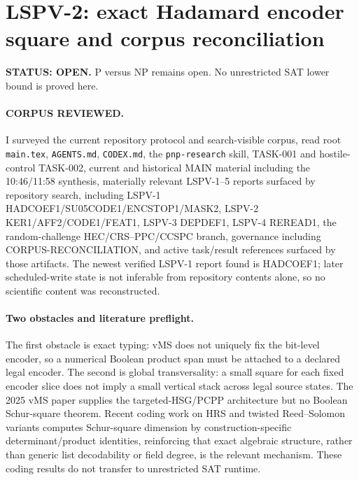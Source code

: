 \documentclass[11pt]{article}
\begin{document}
\section*{LSPV-2: exact Hadamard encoder square and corpus reconciliation}
\textbf{STATUS: OPEN.} P versus NP remains open. No unrestricted SAT lower bound is proved here.

\paragraph{CORPUS REVIEWED.}
I surveyed the current repository protocol and search-visible corpus, read root \texttt{main.tex}, \texttt{AGENTS.md}, \texttt{CODEX.md}, the \texttt{pnp-research} skill, TASK-001 and hostile-control TASK-002, current and historical MAIN material including the 10:46/11:58 synthesis, materially relevant LSPV-1--5 reports surfaced by repository search, including LSPV-1 HADCOEF1/SU05CODE1/ENCSTOP1/MASK2, LSPV-2 KER1/AFF2/CODE1/FEAT1, LSPV-3 DEPDEF1, LSPV-4 REREAD1, the random-challenge HEC/CRS--PPC/CCSPC branch, governance including CORPUS-RECONCILIATION, and active task/result references surfaced by those artifacts. The newest verified LSPV-1 report found is HADCOEF1; later scheduled-write state is not inferable from repository contents alone, so no scientific content was reconstructed.

\paragraph{Two obstacles and literature preflight.}
The first obstacle is exact typing: vMS does not uniquely fix the bit-level encoder, so a numerical Boolean product span must be attached to a declared legal encoder. The second is global transversality: a small square for each fixed encoder slice does not imply a small vertical stack across legal source states. The 2025 vMS paper supplies the targeted-HSG/PCPP architecture but no Boolean Schur-square theorem. Recent coding work on HRS and twisted Reed--Solomon variants computes Schur-square dimension by construction-specific determinant/product identities, reinforcing that exact algebraic structure, rather than generic list decodability or field degree, is the relevant mechanism. These coding results do not transfer to unrestricted SAT runtime.
\end{document}
